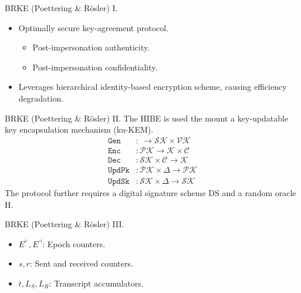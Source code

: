 \documentclass{beamer}
\begin{document}
\begin{frame}{BRKE (Poettering \& Rösler) I.}
  \begin{itemize}
  \item Optimally secure key-agreement protocol.
    \begin{itemize}
    \item Post-impersonation authenticity.
    \item Post-impersonation confidentiality.
    \end{itemize}
  \item Leverages hierarchical identity-based encryption scheme,
    causing efficiency degradation.
  \end{itemize}
\end{frame}

\begin{frame}{BRKE (Poettering \& Rösler) II.}
  The HIBE is used the mount a key-updatable key encapsulation mechanism (ku-KEM).
  \begin{align*}
    \texttt{Gen} & : \ \rightarrow \mathcal{SK} \times \mathcal{VK} \\
    \texttt{Enc} & : \mathcal{PK} \rightarrow \mathcal{K} \times \mathcal{C} \\ 
    \texttt{Dec} & : \mathcal{SK} \times \mathcal{C} \rightarrow \mathcal{K} \\
    \texttt{UpdPk} & : \mathcal{PK} \times \Delta \rightarrow \mathcal{PK} \\
    \texttt{UpdSk} & : \mathcal{SK} \times \Delta \rightarrow \mathcal{SK}
  \end{align*}
  The protocol further requires a digital signature scheme DS and a random
  oracle H.
\end{frame}

\begin{frame}{BRKE (Poettering \& Rösler) III.}
  \scriptsize
   \begin{minipage}[h]{0.59\textwidth}
      \begin{figure}[h]
        \centering
        \setlength{\fboxsep}{10pt}
        \scalebox{0.7}{%
        \fbox{%
          
        }
      }
    \end{figure}
    \end{minipage}
   \begin{minipage}[h]{0.40\textwidth}
      \begin{itemize}
      \item $E^\vdash,E^\dashv$: Epoch counters.
      \item $s, r$: Sent and received counters.
      \item $t, L_S, L_R$: Transcript accumulators.
      \end{itemize}
  \end{minipage}
\end{frame}
\end{document}

